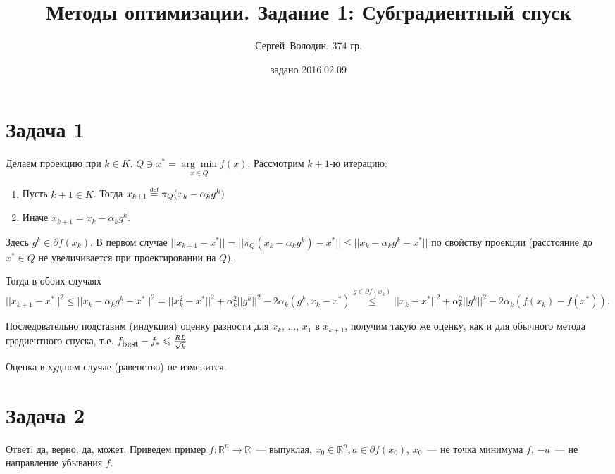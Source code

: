 \documentclass[a4paper]{article}
\title{Методы оптимизации. Задание 1: Субградиентный спуск}
\date{задано 2016.02.09}
\author{Сергей~Володин, 374 гр.}
\def\eqdef{\overset{\mbox{\tiny def}}{=}}
\begin{document}
\maketitle
\section*{Задача 1}
Делаем проекцию при $k\in K$. $Q\ni x^*=\underset{x\in Q}{\arg\min} f(x)$. Рассмотрим $k+1$-ю итерацию:
\begin{enumerate}
\item Пусть $k+1\in K$. Тогда $x_{k+1}\eqdef \pi_Q(x_k-\alpha_k g^k)$
\item Иначе $x_{k+1}=x_k-\alpha_k g^k$.
\end{enumerate}

Здесь $g^k\in\partial f(x_k)$. В первом случае $||x_{k+1}-x^*||=||\pi_Q(x_k-\alpha_k g^k)-x^*||\leqslant||x_k-\alpha_k g^k-x^*||$ по свойству проекции (расстояние до $x^*\in Q$ не увеличивается при проектировании на $Q$).

Тогда в обоих случаях $||x_{k+1}-x^*||^2\leqslant ||x_k-\alpha_k g^k-x^*||^2=||x_k^2-x^*||^2+\alpha_k^2||g^k||^2-2\alpha_k(g^k, x_k-x^*)\overset{g\in\partial f(x_k)}{\leqslant}||x_k-x^*||^2+\alpha_k^2||g^k||^2-2\alpha_k(f(x_k)-f(x^*))$.

Последовательно подставим (индукция) оценку разности для $x_k$, ..., $x_1$ в $x_{k+1}$, получим такую же оценку, как и для обычного метода градиентного спуска, т.е. $f_{\mbox{\small{best}}}-f_*\leqslant \frac{RL}{\sqrt{k}}$

Оценка в худшем случае (равенство) не изменится.

\section*{Задача 2}
Ответ: да, верно, да, может. Приведем пример $f\colon \mathbb{R}^n\to\mathbb{R}$~--- выпуклая,
$x_0\in\mathbb{R}^n, a\in\partial f(x_0)$, $x_0$~--- не точка минимума $f$, $-a$~--- не направление убывания $f$.
\end{document}
